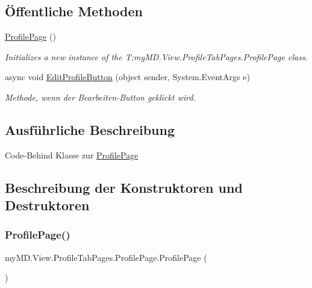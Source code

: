 \subsection*{Öffentliche Methoden}
\begin{DoxyCompactItemize}
\item 
\mbox{\hyperlink{classmy_m_d_1_1_view_1_1_profile_tab_pages_1_1_profile_page_a5be5466e59fdf1afd7f16aee673b2915}{Profile\+Page}} ()
\begin{DoxyCompactList}\small\item\em Initializes a new instance of the T\+:my\+M\+D.\+View.\+Profile\+Tab\+Pages.\+Profile\+Page class. \end{DoxyCompactList}\item 
async void \mbox{\hyperlink{classmy_m_d_1_1_view_1_1_profile_tab_pages_1_1_profile_page_abab1096a4fd1feed046a0a83cd66ff84}{Edit\+Profile\+Button}} (object sender, System.\+Event\+Args e)
\begin{DoxyCompactList}\small\item\em Methode, wenn der Bearbeiten-\/\+Button geklickt wird. \end{DoxyCompactList}\end{DoxyCompactItemize}


\subsection{Ausführliche Beschreibung}
Code-\/\+Behind Klasse zur \mbox{\hyperlink{classmy_m_d_1_1_view_1_1_profile_tab_pages_1_1_profile_page}{Profile\+Page}} 



\subsection{Beschreibung der Konstruktoren und Destruktoren}
\mbox{\label{classmy_m_d_1_1_view_1_1_profile_tab_pages_1_1_profile_page_a5be5466e59fdf1afd7f16aee673b2915}} 
\subsubsection{\texorpdfstring{Profile\+Page()}{ProfilePage()}}
{\footnotesize\ttfamily my\+M\+D.\+View.\+Profile\+Tab\+Pages.\+Profile\+Page.\+Profile\+Page (\begin{DoxyParamCaption}{ }\end{DoxyParamCaption})}



